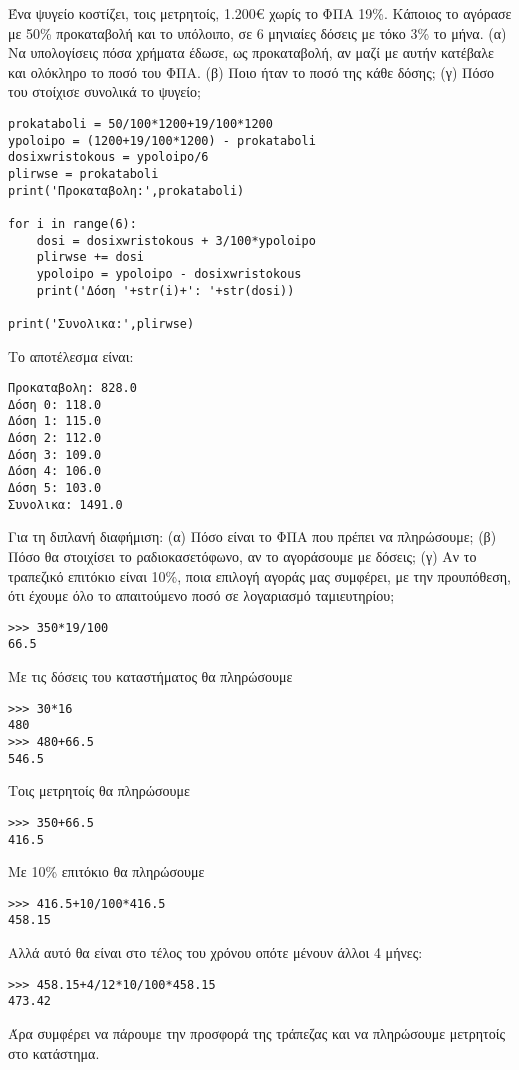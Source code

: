 \begin{exercise}
Ένα ψυγείο κοστίζει, τοις μετρητοίς, 1.200€ χωρίς το ΦΠΑ 19\%. Κάποιος το αγόρασε με 50\%
προκαταβολή και το υπόλοιπο, σε 6 μηνιαίες δόσεις με τόκο 3\% το μήνα. (α) Να υπολογίσεις
πόσα χρήματα έδωσε, ως προκαταβολή, αν μαζί με αυτήν κατέβαλε και ολόκληρο το ποσό του
ΦΠΑ. (β) Ποιο ήταν το ποσό της κάθε δόσης; (γ) Πόσο του στοίχισε συνολικά το ψυγείο;
\end{exercise}

\begin{lstlisting}
prokataboli = 50/100*1200+19/100*1200
ypoloipo = (1200+19/100*1200) - prokataboli
dosixwristokous = ypoloipo/6
plirwse = prokataboli
print('Προκαταβολη:',prokataboli)

for i in range(6):
    dosi = dosixwristokous + 3/100*ypoloipo
    plirwse += dosi
    ypoloipo = ypoloipo - dosixwristokous
    print('Δόση '+str(i)+': '+str(dosi))

print('Συνολικα:',plirwse)
\end{lstlisting}

Το αποτέλεσμα είναι:
\begin{lstlisting}
Προκαταβολη: 828.0
Δόση 0: 118.0
Δόση 1: 115.0
Δόση 2: 112.0
Δόση 3: 109.0
Δόση 4: 106.0
Δόση 5: 103.0
Συνολικα: 1491.0
\end{lstlisting}
\begin{exercise}
Για τη διπλανή διαφήμιση: (α) Πόσο είναι το ΦΠΑ που πρέπει να
πληρώσουμε; (β) Πόσο θα στοιχίσει το ραδιοκασετόφωνο, αν το
αγοράσουμε με δόσεις; (γ) Αν το τραπεζικό επιτόκιο είναι 10\%,
ποια επιλογή αγοράς μας συμφέρει, με την προυπόθεση, ότι
έχουμε όλο το απαιτούμενο ποσό σε λογαριασμό ταμιευτηρίου;
\end{exercise}
\begin{lstlisting}
>>> 350*19/100
66.5
\end{lstlisting}
Με τις δόσεις του καταστήματος θα πληρώσουμε
\begin{lstlisting}
>>> 30*16
480
>>> 480+66.5
546.5
\end{lstlisting}

Τοις μετρητοίς θα πληρώσουμε 
\begin{lstlisting}
>>> 350+66.5
416.5
\end{lstlisting}
Με 10\% επιτόκιο θα πληρώσουμε
\begin{lstlisting}
>>> 416.5+10/100*416.5
458.15
\end{lstlisting}
Αλλά αυτό θα είναι στο τέλος του χρόνου οπότε μένουν άλλοι 4 μήνες:
\begin{lstlisting}
>>> 458.15+4/12*10/100*458.15
473.42
\end{lstlisting}
Άρα συμφέρει να πάρουμε την προσφορά της τράπεζας και να πληρώσουμε μετρητοίς στο κατάστημα.



